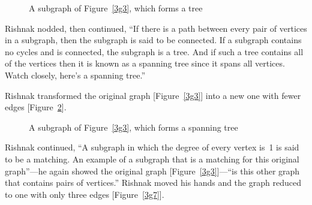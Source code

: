 \begin{figure}
\begin{center}
\caption{A subgraph of Figure~\ref{3g3}, which forms a tree}\label{3g5}
\end{center}
\end{figure}

Rishnak nodded, then continued, ``If there is a path between every pair of vertices in a subgraph, then the subgraph is said to be connected. If a subgraph contains no cycles and is connected, the subgraph is a tree. And if such a tree contains all of the vertices then it is known as a spanning tree since it spans all vertices. Watch closely, here's a spanning tree.''

Rishnak transformed the original graph [Figure~\ref{3g3}] into a new one with fewer edges [Figure~\ref{3g6}].

\begin{figure}
\begin{center}
\caption{A subgraph of Figure~\ref{3g3}, which forms a spanning tree}\label{3g6}
\end{center}
\end{figure}

Rishnak continued, ``A subgraph in which the degree of every vertex is~1 is said to be a matching. An example of a subgraph that is a matching for this original graph''---he again showed the original graph [Figure~\ref{3g3}]---``is this other graph that contains pairs of vertices.'' Rishnak moved his hands and the graph reduced to one with only three edges [Figure~\ref{3g7}].

